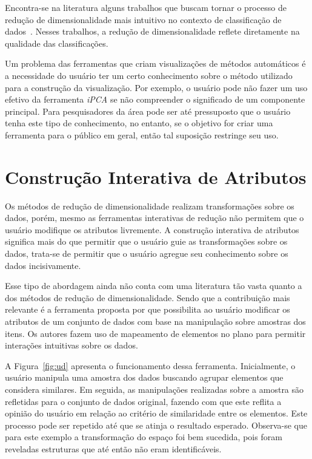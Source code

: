Encontra-se na literatura alguns trabalhos que buscam tornar o
processo de redução de dimensionalidade mais intuitivo no
contexto de classificação de dados~\citet{Zhang2006,
Choo2010, Paiva2012}. Nesses trabalhos, a redução
de dimensionalidade reflete diretamente na qualidade das
classificações. 

Um problema das ferramentas que criam visualizações de
métodos automáticos é a necessidade do usuário ter um certo
conhecimento sobre o método utilizado para a construção da
visualização. Por exemplo, o usuário pode não fazer um uso
efetivo da ferramenta \emph{iPCA} se não compreender o significado
de  um componente principal.  Para pesquisadores da área
pode ser até pressuposto que o usuário tenha este tipo de
conhecimento, no entanto, se o objetivo for criar uma
ferramenta para o público em geral, então tal suposição 
restringe seu uso.

\section{Construção Interativa de Atributos}\label{sec:tr}

Os métodos de redução de dimensionalidade realizam
transformações sobre os dados, porém, mesmo as ferramentas
interativas de redução não permitem que o usuário modifique
os atributos livremente. A construção interativa de
atributos significa mais do que permitir que o usuário guie
as transformações sobre os dados, trata-se de permitir que o
usuário agregue seu conhecimento sobre os dados
incisivamente.

Esse tipo de abordagem ainda não conta com uma literatura
tão vasta quanto a dos métodos de redução de
dimensionalidade. Sendo que a contribuição mais relevante é a
ferramenta proposta por \citet{Gladys2013} que possibilita ao
usuário modificar os atributos de um conjunto de dados com
base na manipulação sobre amostras dos itens. Os autores
fazem uso de mapeamento de elementos no plano para permitir
interações intuitivas sobre os dados. 

A Figura~\ref{fig:ud} apresenta  o funcionamento dessa
ferramenta. Inicialmente, o usuário manipula uma amostra dos
dados buscando  agrupar elementos que considera similares.
Em seguida, as manipulações realizadas sobre a amostra são
refletidas para o conjunto de dados original, fazendo com
que este reflita a opinião do usuário em relação ao critério
de similaridade entre os elementos. Este processo pode ser
repetido até que se atinja o resultado esperado.  Observa-se
que para este exemplo a transformação do espaço foi bem
sucedida, pois foram reveladas estruturas que até então não
eram identificáveis.

